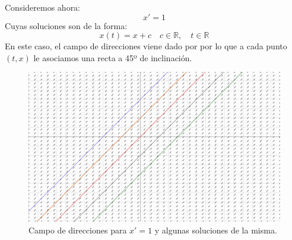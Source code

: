 \begin{ejemplo}
    Consideremos ahora:
    \begin{equation*}
        x' = 1
    \end{equation*}
    Cuyas soluciones son de la forma:
    \begin{equation*}
        x(t) = x + c \quad c\in \mathbb{R}, \quad t\in \mathbb{R}
    \end{equation*}
    En este caso, el campo de direcciones viene dado por
    por lo que a cada punto $(t,x)$ le asociamos una recta a 45º de inclinación.

\ifdefined\showimages
    \begin{figure}[H]
        \centering
        \includegraphics[width=0.6\linewidth]{Imagenes/campo_direcciones_2.png}
        \caption{Campo de direcciones para $x'=1$ y algunas soluciones de la misma.}
    \end{figure}
\fi
\end{ejemplo}

